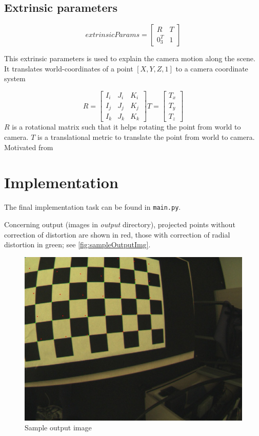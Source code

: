 \documentclass[a4paper, twoside, english]{article}
\begin{document}
\subsection{Extrinsic parameters}
\begin{equation*} extrinsicParams = 
\begin{bmatrix}
R & T \\
0_3^T & 1
\end{bmatrix}
\end{equation*}

This extrinsic parameters is used to explain the camera motion along the scene. It translates world-coordinates of a point $[X,Y,Z,1]$ to a camera coordinate system

\begin{equation*} R = 
\begin{bmatrix}
I_i & J_i & K_i \\
I_j & J_j & K_j \\
I_k & J_k & K_k 
\end{bmatrix}
T=
\begin{bmatrix}
T_x \\
T_y \\
T_z
\end{bmatrix}
\end{equation*}
$R$ is a rotational matrix such that it helps rotating the point from world to camera.
$T$ is a translational metric to translate the point from world to camera.
Motivated from \cite{SomeLinearAlgebra}


\section{Implementation}

The final implementation task can be found in \lstinline{main.py}.

Concerning output (images in \textit{output} directory), projected points without correction of distortion are shown in red, those with correction of radial distortion in green; see \autoref{fig:sampleOutputImg}.

\begin{figure}
  \includegraphics[width=\textwidth]{00000.jpg}
  \caption{Sample output image\label{fig:sampleOutputImg}}
\end{figure}



\end{document}
